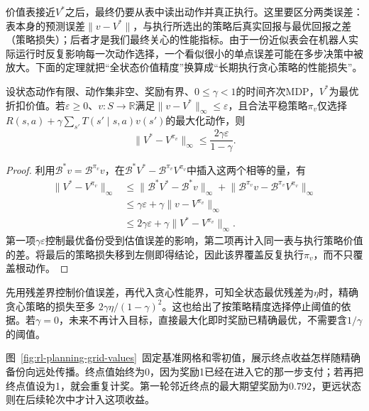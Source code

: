 价值表接近$V^*$之后，最终仍要从表中读出动作并真正执行。这里要区分两类误差：表本身的预测误差$\|v-V^*\|$，与执行所选出的策略后真实回报与最优回报之差（策略损失）；后者才是我们最终关心的性能指标。由于一份近似表会在机器人实际运行时反复影响每一次动作选择，一个看似很小的单点误差可能在多步决策中被放大。下面的定理就把“全状态价值精度”换算成“长期执行贪心策略的性能损失”。

\begin{theorem}[由价值精度到贪心策略性能]
 \label{thm:rl-planning-greedy-loss}
 设状态动作有限、动作集非空、奖励有界、$0\leq\gamma<1$的时间齐次MDP，$V^*$为最优折扣价值。若$\varepsilon\geq0$、$v:S\to\mathbb R$满足$\lVert v-V^*\rVert_\infty\leq\varepsilon$，且合法平稳策略$\pi_v$仅选择$R(s,a)+\gamma\sum_{s'}T(s'\mid s,a)v(s')$的最大化动作，则
 \begin{equation}
 \lVert V^*-V^{\pi_v}\rVert_\infty
 \leq\frac{2\gamma\varepsilon}{1-\gamma}.
 \label{eq:rl-planning-greedy-loss}
 \end{equation}
\end{theorem}
\begin{proof}
 利用$\mathcal B^*v=\mathcal B^{\pi_v}v$，在$\mathcal B^*V^*-\mathcal B^{\pi_v}V^{\pi_v}$中插入这两个相等的量，有
 \[
 \begin{aligned}
 \lVert V^*-V^{\pi_v}\rVert_\infty
 &\leq\lVert \mathcal B^*V^*-\mathcal B^*v\rVert_\infty
       +\lVert \mathcal B^{\pi_v}v-\mathcal B^{\pi_v}V^{\pi_v}\rVert_\infty\\
 &\leq\gamma\varepsilon+
       \gamma\lVert v-V^{\pi_v}\rVert_\infty\\
 &\leq2\gamma\varepsilon+
       \gamma\lVert V^*-V^{\pi_v}\rVert_\infty.
 \end{aligned}
 \]
 第一项$\gamma\varepsilon$控制最优备份受到估值误差的影响，第二项再计入同一表与执行策略价值的差。将最后的策略损失移到左侧即得结论，因此该界覆盖反复执行$\pi_v$，而不只覆盖根动作。
\end{proof}

先用残差界控制价值误差，再代入贪心性能界，可知全状态最优残差为$\eta$时，精确贪心策略的损失至多
$2\gamma\eta/(1-\gamma)^2$。这也给出了按策略精度选择停止阈值的依据。若$\gamma=0$，未来不再计入目标，直接最大化即时奖励已精确最优，不需要含$1/\gamma$的阈值。

图~\ref{fig:rl-planning-grid-values}~固定基准网格和零初值，展示终点收益怎样随精确备份向远处传播。终点值始终为0，因为奖励1已经在进入它的那一步支付；若再把终点值设为1，就会重复计奖。第一轮邻近终点的最大期望奖励为$0.792$，更远状态则在后续轮次中才计入这项收益。

